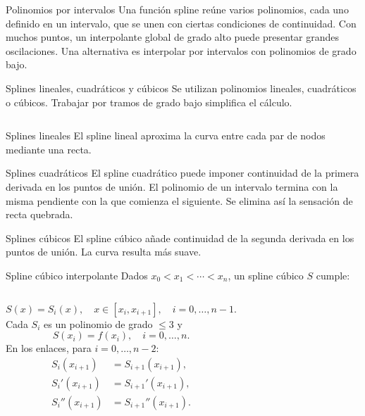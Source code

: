 \documentclass[main.tex]{subfiles}
\begin{document}
\begin{frame}[t]{Polinomios por intervalos}
Una función spline reúne varios polinomios, cada uno definido en un intervalo, que se unen con ciertas condiciones de continuidad.
\bigskip
Con muchos puntos, un interpolante global de grado alto puede presentar grandes oscilaciones.
\bigskip
Una alternativa es interpolar por intervalos con polinomios de grado bajo.
\end{frame}
\begin{frame}[t]{Splines lineales, cuadráticos y cúbicos}
\small Se utilizan polinomios lineales, cuadráticos o cúbicos. Trabajar por tramos de grado bajo simplifica el cálculo.
\begin{columns}\end{columns}
\end{frame}
\begin{frame}[t]{Splines lineales}
El spline lineal aproxima la curva entre cada par de nodos mediante una recta.
\end{frame}
\begin{frame}[t]{Splines cuadráticos}
El spline cuadrático puede imponer continuidad de la primera derivada en los puntos de unión.
\bigskip
El polinomio de un intervalo termina con la misma pendiente con la que comienza el siguiente.
\bigskip
Se elimina así la sensación de recta quebrada.
\end{frame}
\begin{frame}[t]{Splines cúbicos}
\small El spline cúbico añade continuidad de la segunda derivada en los puntos de unión. La curva resulta más suave.
\end{frame}
\begin{frame}[t]{Spline cúbico interpolante}
\small Dados $x_0<x_1<\cdots<x_n$, un spline cúbico $S$ cumple:
\begin{columns}[T]
\[S(x)=S_i(x),\quad x\in[x_i,x_{i+1}],\quad i=0,\ldots,n-1.\]
Cada $S_i$ es un polinomio de grado $\le3$ y
\[S(x_i)=f(x_i),\quad i=0,\ldots,n.\]
En los enlaces, para $i=0,\ldots,n-2$:
\begin{align*}S_i(x_{i+1})&=S_{i+1}(x_{i+1}),\\
S_i'(x_{i+1})&=S_{i+1}'(x_{i+1}),\\
S_i''(x_{i+1})&=S_{i+1}''(x_{i+1}).\end{align*}
\end{columns}
\end{frame}
\end{document}
